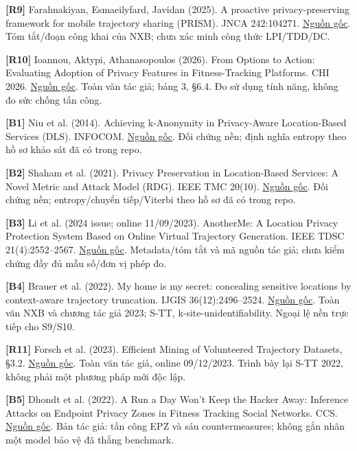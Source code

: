 \documentclass[10pt,a4paper]{article}
\begin{document}
\par\hypertarget{ref-R9}{}\textbf{[R9]} Farahnakiyan, Esmaeilyfard, Javidan (2025). A proactive privacy-preserving framework for mobile trajectory sharing (PRISM). JNCA 242:104271. \href{https://www.sciencedirect.com/science/article/pii/S1084804525001687}{Nguồn gốc}. Tóm tắt/đoạn công khai của NXB; chưa xác minh công thức LPI/TDD/DC.
\par\hypertarget{ref-R10}{}\textbf{[R10]} Ioannou, Aktypi, Athanasopoulos (2026). From Options to Action: Evaluating Adoption of Privacy Features in Fitness-Tracking Platforms. CHI 2026. \href{https://elathan.github.io/papers/chi26.pdf}{Nguồn gốc}. Toàn văn tác giả; bảng 3, §6.4. Đo sử dụng tính năng, không đo sức chống tấn công.
\par\hypertarget{ref-B1}{}\textbf{[B1]} Niu et al. (2014). Achieving k-Anonymity in Privacy-Aware Location-Based Services (DLS). INFOCOM. \href{https://doi.org/10.1109/INFOCOM.2014.6848002}{Nguồn gốc}. Đối chứng nền; định nghĩa entropy theo hồ sơ khảo sát đã có trong repo.
\par\hypertarget{ref-B2}{}\textbf{[B2]} Shaham et al. (2021). Privacy Preservation in Location-Based Services: A Novel Metric and Attack Model (RDG). IEEE TMC 20(10). \href{https://doi.org/10.1109/TMC.2020.2993599}{Nguồn gốc}. Đối chứng nền; entropy/chuyển tiếp/Viterbi theo hồ sơ đã có trong repo.
\par\hypertarget{ref-B3}{}\textbf{[B3]} Li et al. (2024 issue; online 11/09/2023). AnotherMe: A Location Privacy Protection System Based on Online Virtual Trajectory Generation. IEEE TDSC 21(4):2552–2567. \href{https://ieeexplore.ieee.org/document/10246991/}{Nguồn gốc}. Metadata/tóm tắt và mã nguồn tác giả; chưa kiểm chứng đầy đủ mẫu số/đơn vị phép đo.
\par\hypertarget{ref-B4}{}\textbf{[B4]} Brauer et al. (2022). My home is my secret: concealing sensitive locations by context-aware trajectory truncation. IJGIS 36(12):2496–2524. \href{https://doi.org/10.1080/13658816.2022.2081694}{Nguồn gốc}. Toàn văn NXB và chương tác giả 2023; S-TT, k-site-unidentifiability. Ngoại lệ nền trực tiếp cho S9/S10.
\par\hypertarget{ref-R11}{}\textbf{[R11]} Forsch et al. (2023). Efficient Mining of Volunteered Trajectory Datasets, §3.2. \href{https://link.springer.com/chapter/10.1007/978-3-031-35374-1_3}{Nguồn gốc}. Toàn văn tác giả, online 09/12/2023. Trình bày lại S-TT 2022, không phải một phương pháp mới độc lập.
\par\hypertarget{ref-B5}{}\textbf{[B5]} Dhondt et al. (2022). A Run a Day Won’t Keep the Hacker Away: Inference Attacks on Endpoint Privacy Zones in Fitness Tracking Social Networks. CCS. \href{https://people.cs.kuleuven.be/~stijn.volckaert/papers/2022_CCS_Fitness_Tracking.pdf}{Nguồn gốc}. Bản tác giả: tấn công EPZ và sáu countermeasures; không gắn nhãn một model bảo vệ đã thắng benchmark.
\end{document}
